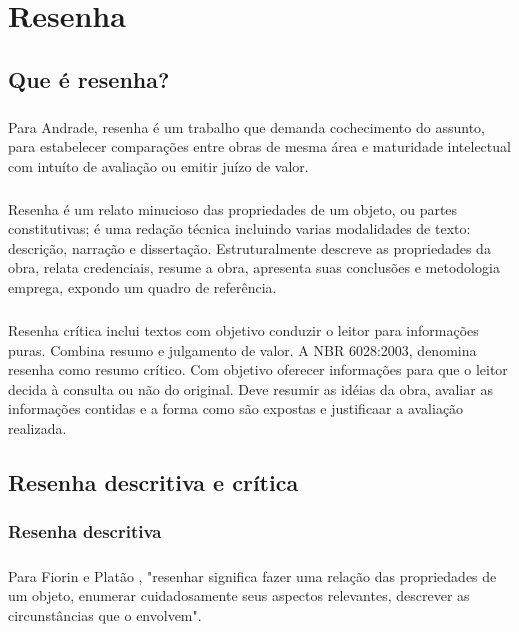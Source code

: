\chapter{Resenha}

\section{Que é resenha?}

\paragraph{}
Para Andrade, resenha é um trabalho que demanda cochecimento do assunto, para estabelecer comparações entre obras de mesma área e maturidade intelectual com intuíto de avaliação ou emitir juízo de valor.

\paragraph{}
Resenha é um relato minucioso das propriedades de um objeto, ou partes constitutivas; é uma redação técnica incluindo varias modalidades de texto: descrição, narração e dissertação. Estruturalmente descreve as propriedades da obra, relata credenciais, resume a obra, apresenta suas conclusões e metodologia emprega, expondo um quadro de referência.

\paragraph{}
Resenha crítica inclui textos com objetivo conduzir o leitor para informações puras. Combina resumo e julgamento de valor. A NBR 6028:2003, denomina resenha como resumo crítico. Com objetivo oferecer informações para que o leitor decida à consulta ou não do original. Deve resumir as idéias da obra, avaliar as informações contidas e a forma como são expostas e justificaar a avaliação realizada.

\section{Resenha descritiva e crítica}

\subsection{Resenha descritiva}

\paragraph{}
Para Fiorin e Platão , "resenhar significa fazer uma relação das propriedades de um objeto, enumerar cuidadosamente seus aspectos relevantes, descrever as circunstâncias que o envolvem".

